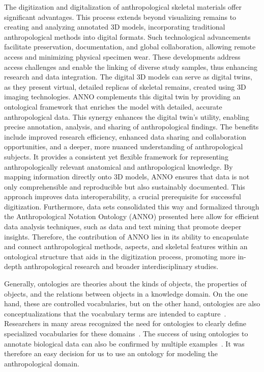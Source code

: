 \documentclass[sw]{iosart2x}
\begin{document}
The digitization and digitalization of anthropological skeletal materials offer significant advantages.
This process extends beyond visualizing remains to creating and analyzing annotated 3D models, incorporating traditional anthropological methods into digital formats.
Such technological advancements facilitate preservation, documentation, and global collaboration, allowing remote access and minimizing physical specimen wear.
These developments address access challenges and enable the linking of diverse study samples, thus enhancing research and data integration.
The digital 3D models can serve as digital twins, as they present virtual, detailed replicas of skeletal remains, created using 3D imaging technologies.
ANNO complements this digital twin by providing an ontological framework that enriches the model with detailed, accurate anthropological data.
This synergy enhances the digital twin's utility, enabling precise annotation, analysis, and sharing of anthropological findings.
The benefits include improved research efficiency, enhanced data sharing and collaboration opportunities, and a deeper, more nuanced understanding of anthropological subjects.
It provides a consistent yet flexible framework for representing anthropologically relevant anatomical and anthropological knowledge.
By mapping information directly onto 3D models, ANNO ensures that data is not only comprehensible and reproducible but also sustainably documented.
This approach improves data interoperability, a crucial prerequisite for successful digitization.
Furthermore, data sets consolidated this way and formalized through the Anthropological Notation Ontology (ANNO) presented here allow for efficient data analysis techniques, such as data and text mining that promote deeper insights.
Therefore, the contribution of ANNO lies in its ability to encapsulate and connect anthropological methods, aspects, and skeletal features within an ontological structure that aids in the digitization process, promoting more in-depth anthropological research and broader interdisciplinary studies.

Generally, ontologies are theories about the kinds of objects, the properties of objects, and the relations between objects in a knowledge domain.
On the one hand, these are controlled vocabularies, but on the other hand, ontologies are also conceptualizations that the vocabulary terms are intended to capture~\citep{whatareontologies}.
Researchers in many areas recognized the need for ontologies to clearly define specialized vocabularies for these domains~\citep{evaluatingdomain}.
The success of using ontologies to annotate biological data can also be confirmed by multiple examples~\citep{biomedicalontologies}.
It was therefore an easy decision for us to use an ontology for modeling the anthropological domain.
\end{document}
